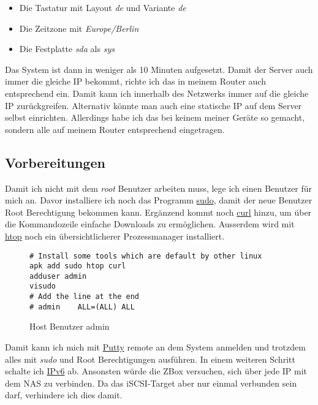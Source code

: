 \documentclass[12pt,a4paper]{article}
\newcommand{\code}[1]{\textit{#1}}
\begin{document}
\begin{itemize}
    \item Die Tastatur mit Layout \code{de} und Variante  \code{de}
    \item Die Zeitzone mit \code{Europe/Berlin}
    \item Die Festplatte \code{sda} als \code{sys}
\end{itemize}

Das System ist dann in weniger als 10 Minuten aufgesetzt. Damit der Server auch immer die gleiche IP bekommt, richte ich
das in meinem Router auch entsprechend ein. Damit kann ich innerhalb des Netzwerks immer auf die gleiche IP
zurückgreifen. Alternativ könnte man auch eine statische IP auf dem Server selbst einrichten. Allerdings habe ich das
bei keinem meiner Geräte so gemacht, sondern alle auf meinem Router entsprechend eingetragen.

\subsection{Vorbereitungen}
Damit ich nicht mit dem \code{root} Benutzer arbeiten muss, lege ich einen Benutzer für mich an. Davor installiere ich
noch das Programm \href{https://de.wikipedia.org/wiki/Sudo}{sudo}, damit der neue Benutzer Root Berechtigung bekommen
kann. Ergänzend kommt noch \href{https://curl.haxx.se/}{curl} hinzu, um über die Kommandozeile einfache Downloads zu
ermöglichen. Ausserdem wird mit \href{http://hisham.hm/htop/index.php?page=main}{htop} noch ein übersichtlicherer
Prozessmanager installiert.

\begin{figure}[H]
\begin{lstlisting}
# Install some tools which are default by other linux
apk add sudo htop curl
adduser admin
visudo
# Add the line at the end
# admin    ALL=(ALL) ALL
\end{lstlisting}
\caption{Host Benutzer admin}\label{fig:Host Benutzer admin}
\end{figure}

Damit kann ich mich mit \href{https://www.chiark.greenend.org.uk/~sgtatham/putty/latest.html}{Putty} remote an dem
System anmelden und trotzdem alles mit \code{sudo} und Root Berechtigungen ausführen. In einem weiteren Schritt schalte
ich \href{https://de.wikipedia.org/wiki/IPv6}{IPv6} ab. Ansonsten würde die ZBox versuchen, sich über jede IP mit dem
NAS zu verbinden. Da das iSCSI-Target aber nur einmal verbunden sein darf, verhindere ich dies damit.
\end{document}
